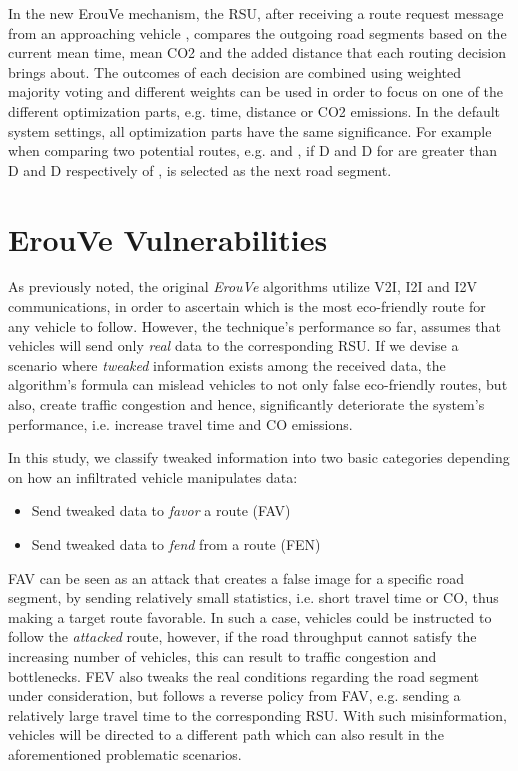 \documentclass[conference]{IEEEtran}
\begin{document}
In the new ErouVe mechanism, the RSU, after receiving a route request message from an approaching vehicle , compares the outgoing road segments based on the current mean time, mean CO2 and the added distance that each routing decision brings about. The outcomes of each decision are combined using weighted majority  voting and different weights can be used in order to focus on one of the different optimization parts, e.g. time, distance or CO2
emissions. In the default system settings, all optimization parts have the same significance. For example when comparing two potential routes, e.g.  and , if D and D for  are greater than D and D respectively of ,  is selected as the next road segment. 


\section{ErouVe Vulnerabilities}
\label{erouve-vulnerabilitues}
As previously noted, the original {\it ErouVe} algorithms utilize V2I, I2I and I2V communications, in order to ascertain which is the most eco-friendly route
for any vehicle to follow. However, the technique's performance so far, assumes that vehicles will send only {\it real} data to the corresponding
RSU. If we devise a scenario where {\it tweaked} information exists among the received data, the algorithm's formula can mislead vehicles to not only
false eco-friendly routes, but also, create traffic congestion and hence, significantly deteriorate the system's performance, i.e. increase travel time and 
CO emissions.


In this study, we classify tweaked information into two basic categories depending on how an infiltrated vehicle manipulates data: 

\begin{itemize}
\item Send tweaked data to {\it favor} a route (FAV)
\item Send tweaked data to {\it fend} from a route (FEN)
\end{itemize}

FAV can be seen as an attack that creates a false image for a specific road segment, by sending relatively 
small statistics, i.e. short travel time or CO, thus making a target route favorable. In such a case, vehicles could be instructed to follow the {\it attacked} 
route,  however, if the road throughput cannot satisfy the increasing number of vehicles, this can result to traffic congestion and bottlenecks. 
FEV also tweaks the real conditions regarding the road segment under consideration, but follows a reverse policy from FAV, e.g. sending a relatively 
large travel time to the corresponding RSU. With such misinformation, vehicles will be directed to a different path which can also result in the aforementioned 
problematic scenarios.
\end{document}
